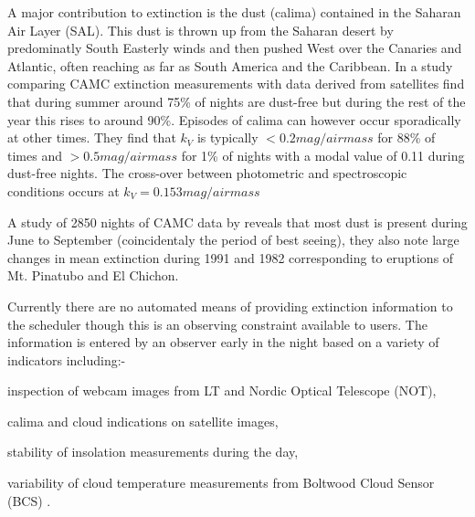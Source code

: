 {{A major contribution to extinction is the dust (calima) contained in the Saharan Air Layer (SAL). This dust is thrown up from the Saharan desert by predominatly South Easterly winds and then pushed West over the Canaries and Atlantic, often reaching as far as South America and the Caribbean. In a study comparing CAMC extinction measurements with data derived from satellites \citet{varela07sat} find that during summer around 75\% of nights are dust-free but during the rest of the year this rises to around 90\%. Episodes of calima can however occur sporadically at other times. They find that $k_V$ is typically $< 0.2 mag/airmass$ for 88\% of times and $> 0.5 mag/airmass$ for 1\% of nights with a modal value of 0.11 during dust-free nights. The cross-over between photometric and spectroscopic conditions occurs at $k_V = 0.153 mag/airmass$

A study of 2850 nights of CAMC data by \citet{guerrero98extinct} reveals that most dust is present during June to September (coincidentaly the period of best seeing), they also note large changes in mean extinction during 1991 and 1982 corresponding to eruptions of Mt. Pinatubo and El Chichon.

Currently there are no automated means of providing extinction information to the scheduler though this is an observing constraint available to users. The information is entered by an observer early in the night based on a variety of indicators including:- \begin{inparaenum}  \item inspection of webcam images from LT and Nordic Optical Telescope (NOT), \item calima and cloud indications on satellite images, \item stability of insolation measurements during the day, \item variability of cloud temperature measurements from Boltwood Cloud Sensor (BCS) \citep{marchant08calib} . \end{inparaenum}

}}

